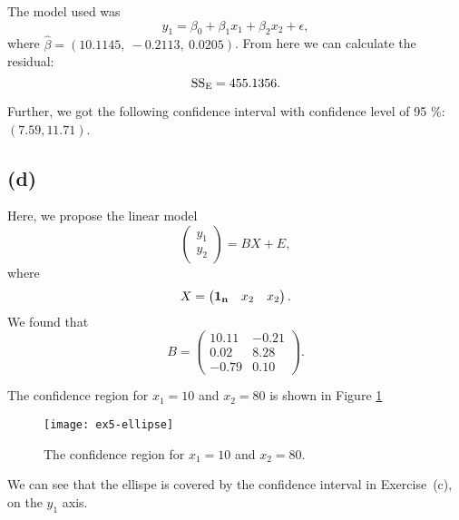 The model used was
\begin{equation*}
  y_1 = \beta_0 + \beta_1 x_1 + \beta_2 x_2 + \epsilon,
\end{equation*}
where $\hat{\beta} = (10.1145,\   -0.2113,\    0.0205)$. From here we
can calculate the residual:
\begin{equation*}
  \text{SS}_{\rm E} = 455.1356.
\end{equation*}

Further, we got the following confidence interval with confidence level of 95
\%: $(7.59, 11.71)$. 

\subsection*{(d)}

Here, we propose the linear model
\begin{equation*}
  \begin{pmatrix}
    y_1 \\ y_2
  \end{pmatrix} = 
  BX + E,
\end{equation*}
where 
\begin{equation*}
  X =
  \begin{pmatrix}
    {\bf 1_n} & x_2 & x_2
  \end{pmatrix}.
\end{equation*}
We found that
\begin{equation*}
  B =
  \begin{pmatrix}
    10.11 & -0.21 \\ 
    0.02 & 8.28 \\ 
    -0.79 & 0.10 
  \end{pmatrix}.
\end{equation*}

The confidence region for $x_1 = 10$ and $x_2 = 80$ is shown in Figure
\ref{fig:ex5-ellipse}
\begin{figure}[h]
  \centering
  \texttt{[image: ex5-ellipse]}
  \caption{The confidence region for $x_1 = 10$ and $x_2 = 80$. }
  \label{fig:ex5-ellipse}
\end{figure}

We can see that the ellispe is covered by 
the confidence interval in Exercise~(c), on the $y_1$ axis.

